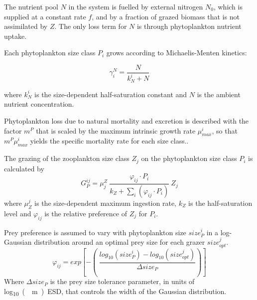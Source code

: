 \documentclass[journal abbreviation, manuscript]{copernicus}
\begin{document}
The nutrient pool $N$ in the system is fuelled by external nitrogen $N_0$, which is supplied at a constant rate $f$, and by a fraction of grazed biomass that is not assimilated by $Z$. The only loss term for $N$ is through phytoplankton nutrient uptake.

Each phytoplankton size class $P_i$ grows according to Michaelis-Menten kinetics:

\begin{equation}
    \gamma_i^N =  \frac{N}{k_N^i + N} 
\end{equation}

where $k_N^i$ is the size-dependent half-saturation constant and $N$ is the ambient nutrient concentration.

Phytoplankton loss due to natural mortality and excretion is described with the factor $m^P$ that is scaled by the maximum intrinsic growth rate $\mu_{max}^i$, so that $m^P \mu_{max}^i$ yields the specific mortality rate for each size class..

The grazing of the zooplankton size class $Z_j$ on the phytoplankton size class $P_i$ is calculated by
\begin{equation}
    G_P^{ij} = \mu_j^Z \ \frac{ \varphi_{ij} \cdot P_i }{ k_Z + \sum_{i}(\varphi_{ij} \cdot P_i) } \ Z_j
\end{equation}
where $\mu_Z^j$ is the size-dependent maximum ingestion rate, $k_Z$ is the half-saturation level and $\varphi_{ij}$ is the relative preference of $Z_j$ for $P_i$.

Prey preference is assumed to vary with phytoplankton size $size_{P}^i$ in a log-Gaussian distribution around an optimal prey size for each grazer $size_{opt}^j$.
\begin{equation}
    \varphi_{ij} = exp \left[ -\left( \ \frac{ log_{10}(size_P^i) - log_{10}(size_{opt}^j) }{ \Delta size_{P} } \right) \right]
\end{equation}
Where $\Delta size_{P}$ is the prey size tolerance parameter, in units of \unit{log_{10}(\mu m) ESD}, that controls the width of the Gaussian distribution.
\end{document}

